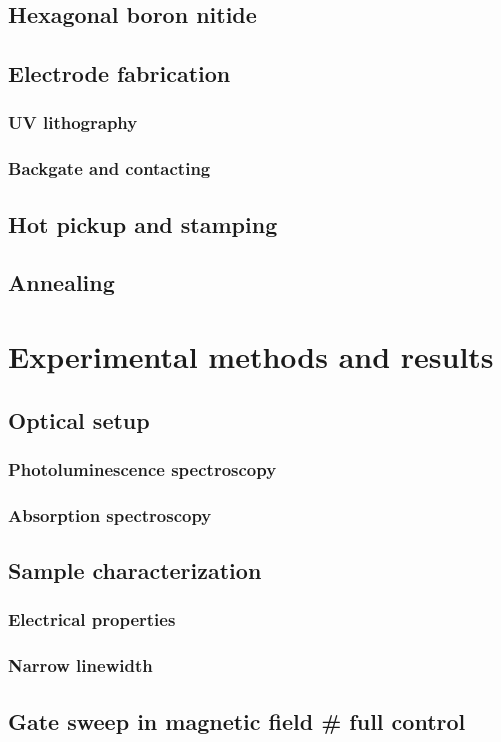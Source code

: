 \documentclass{scrbook}
\begin{document}
	\section{Hexagonal boron nitide}
	\section{Electrode fabrication}
		\subsection{UV lithography}
		\subsection{Backgate and contacting}
	\section{Hot pickup and stamping}
	\section{Annealing}
\chapter{Experimental methods and results}
	\section{Optical setup}
		\subsection{Photoluminescence spectroscopy}
		\subsection{Absorption spectroscopy}
	\section{Sample characterization}
		\subsection{Electrical properties}
		\subsection{Narrow linewidth}
	\section{Gate sweep in magnetic field \# full control}
\end{document}
